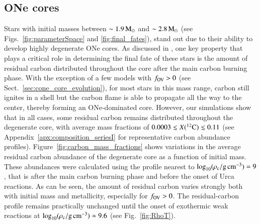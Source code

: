 \documentclass[main.tex]{subfiles}
\begin{document}
\subsection{ONe cores}\label{sec:one_core_evolution}
Stars with initial masses between $\sim 1.9\msun$ and $\sim  2.8\msun$ (see Figs.~\ref{fig:parameterSpace} and \ref{fig:final_fates}),  stand out due to their ability to develop highly degenerate ONe cores. As discussed in , one key property that  plays a critical role in determining the final fate of these stars is the amount of residual carbon distributed throughout the core  after the main carbon burning phase. 
With the exception of a few models with $f_{\rm OV}> 0$ (see Sect.~\ref{sec:cone_core_evolution}), for  most stars in this mass range, carbon still ignites  in a shell but the carbon flame
is able to propagate all the way to the center, thereby forming an ONe-dominated core. 
However, our simulations show that in all cases, some residual carbon remains
distributed throughout the degenerate core, with average mass fractions of $0.0003 \lesssim X(\iso{C}{12}) \lesssim 0.11$ (see Appendix~\ref{apx:composition_seriesI} for representative carbon abundance profiles). 
Figure~\ref{fig:carbon_mass_fractions} shows variations in  the average residual carbon abundance of the degenerate core as a function of initial mass.
These abundances were calculated using the \mesa profile nearest to $\logrhoc=9$, that is after the main carbon burning phase and before the onset of Urca reactions. As can be seen, the amount of residual carbon varies strongly both with initial mass and metallicity, especially for $f_{\rm OV}>0$.  
 The residual-carbon profile remains practically unchanged until the  onset of exothermic weak reactions at $\logrhoc\simeq 9.6$ (see Fig.~\ref{fig:RhoT}).
\end{document}
